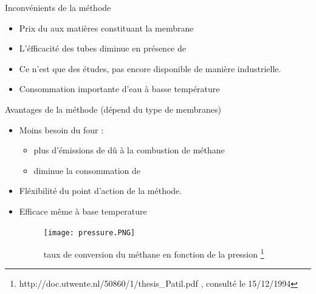 \documentclass{beamer}
\begin{document}
\begin{frame}{Inconvénients de la méthode}
\begin{itemize}
\item Prix du aux matières constituant la membrane 
\item L'éfficacité des tubes diminue en présence de 
\item Ce n'est que des études, pas encore disponible de manière industrielle.
\item Consommation importante d'eau à basse température
\end{itemize}
\end{frame}

\begin{frame}{Avantages de la méthode (dépend du type de membranes)}
\begin{itemize}
\item Moins besoin du four : 
    \begin{itemize}
    \item plus d'émissions de  dû à la combustion de méthane
    \item diminue la consommation de 
    \end{itemize} 
\item Fléxibilité du point d'action de la méthode. 
\item Efficace même à base temperature
\begin{figure}[ht!]
 \centering
 \texttt{[image: pressure.PNG]}
 \caption{taux de conversion du méthane en fonction de la pression \footnote{http://doc.utwente.nl/50860/1/thesis_Patil.pdf
, consulté le 15/12/1994}}
\end{figure}
\end{itemize}
\end{frame}
\end{document}
